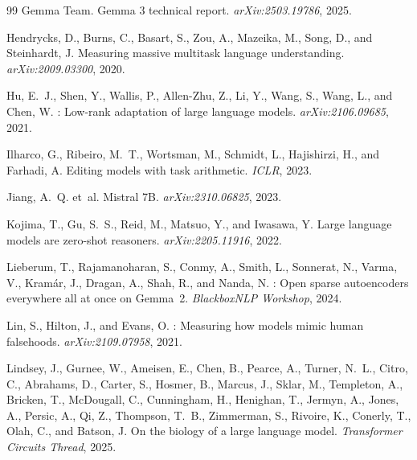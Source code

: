 \documentclass{article}
\begin{document}
\begin{thebibliography}{99}
Gemma Team.
\newblock Gemma 3 technical report.
\newblock \emph{arXiv:2503.19786}, 2025.

Hendrycks, D., Burns, C., Basart, S., Zou, A., Mazeika, M., Song, D.,
 and Steinhardt, J.
\newblock Measuring massive multitask language understanding.
\newblock \emph{arXiv:2009.03300}, 2020.

Hu, E.~J., Shen, Y., Wallis, P., Allen-Zhu, Z., Li, Y., Wang, S.,
 Wang, L., and Chen, W.
: Low-rank adaptation of large language models.
\newblock \emph{arXiv:2106.09685}, 2021.

Ilharco, G., Ribeiro, M.~T., Wortsman, M., Schmidt, L., Hajishirzi,
 H., and Farhadi, A.
\newblock Editing models with task arithmetic.
\newblock \emph{ICLR}, 2023.

Jiang, A.~Q. et~al.
\newblock Mistral 7{B}.
\newblock \emph{arXiv:2310.06825}, 2023.

Kojima, T., Gu, S.~S., Reid, M., Matsuo, Y., and Iwasawa, Y.
\newblock Large language models are zero-shot reasoners.
\newblock \emph{arXiv:2205.11916}, 2022.

Lieberum, T., Rajamanoharan, S., Conmy, A., Smith, L., Sonnerat, N.,
 Varma, V., Kram\'ar, J., Dragan, A., Shah, R., and Nanda, N.
: Open sparse autoencoders everywhere all at
 once on {Gemma~2}.
\newblock \emph{BlackboxNLP Workshop}, 2024.

Lin, S., Hilton, J., and Evans, O.
: Measuring how models mimic human falsehoods.
\newblock \emph{arXiv:2109.07958}, 2021.

Lindsey, J., Gurnee, W., Ameisen, E., Chen, B., Pearce, A.,
 Turner, N.~L., Citro, C., Abrahams, D., Carter, S., Hosmer, B.,
 Marcus, J., Sklar, M., Templeton, A., Bricken, T., McDougall, C.,
 Cunningham, H., Henighan, T., Jermyn, A., Jones, A., Persic, A.,
 Qi, Z., Thompson, T.~B., Zimmerman, S., Rivoire, K., Conerly, T.,
 Olah, C., and Batson, J.
\newblock On the biology of a large language model.
\newblock \emph{Transformer Circuits Thread}, 2025.


\end{thebibliography}
\end{document}

